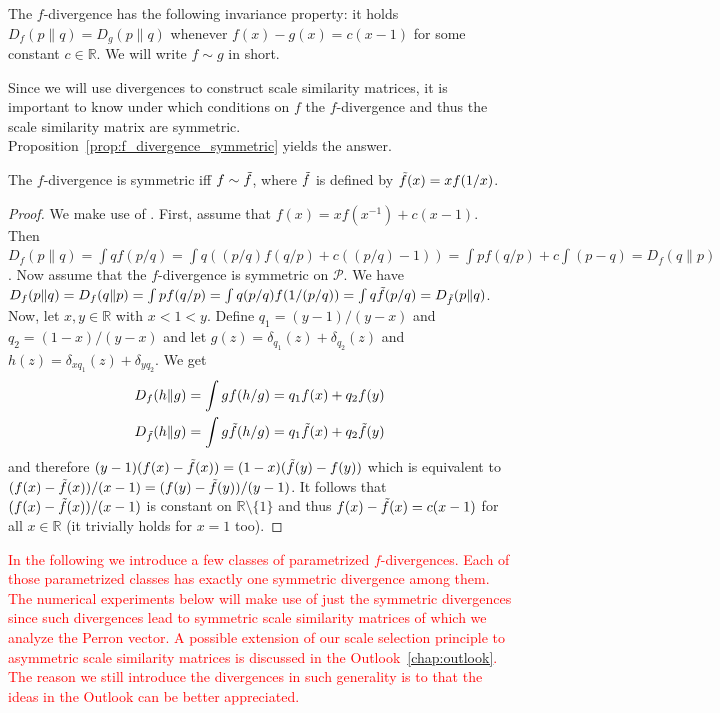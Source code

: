 The $f$-divergence has the following invariance property: it holds $D_f(p\| q)=D_g(p\|q)$ whenever $f(x)-g(x)=c(x-1)$ for some constant $c\in\mathbb{R}$. We will write $f\sim g$ in short.

Since we will use divergences to construct scale similarity matrices, it is important to know under which conditions on $f$ the $f$-divergence and thus the scale similarity matrix are symmetric. Proposition~\ref{prop:f_divergence_symmetric} yields the answer.

\begin{Prop}\label{prop:f_divergence_symmetric}
    The $f$-divergence is symmetric iff $f\sim\Tilde{f}$, where $\Tilde{f}$ is defined by $\Tilde{f}(x)=xf(1/x)$.
\end{Prop}

\begin{proof}
    We make use of \cite[Proposition 7.2]{polyanskiy_information_2025}. First, assume that $f(x)=xf(x^{-1})+c(x-1)$. Then $D_f(p\|q)=\int qf(p/q)=\int q((p/q)f(q/p)+c((p/q)-1))=\int pf(q/p)+c\int(p-q)=D_f(q\|p)$. Now assume that the $f$-divergence is symmetric on $\mathcal{P}$. We have $D_f(p\|q)=D_f(q\|p)=\int pf(q/p)=\int q (p/q)f(1/(p/q))=\int q\Tilde{f}(p/q)=D_{\Tilde{f}}(p\|q)$. Now, let $x,y\in\mathbb{R}$ with $x<1<y$. Define $q_1=(y-1)/(y-x)$ and $q_2=(1-x)/(y-x)$ and let $g(z)=\delta_{q_1}(z)+\delta_{q_2}(z)$ and $h(z)=\delta_{xq_1}(z)+\delta_{yq_2}$. We get
    \begin{align*}
        D_f(h\|g)&=\int gf(h/g)=q_1f(x)+q_2f(y)\\
        D_{\Tilde{f}}(h\|g)&=\int g\Tilde{f}(h/g)=q_1\Tilde{f}(x)+q_2\Tilde{f}(y)
    \end{align*}
    and therefore $(y-1)(f(x)-\Tilde{f}(x))=(1-x)(\Tilde{f}(y)-f(y))$ which is equivalent to $(f(x)-\Tilde{f}(x))/(x-1)=(f(y)-\Tilde{f}(y))/(y-1)$. It follows that $(f(x)-\Tilde{f}(x))/(x-1)$ is constant on $\mathbb{R}\setminus\{1\}$ and thus $f(x)-\Tilde{f}(x)=c(x-1)$ for all $x\in\mathbb{R}$ (it trivially holds for $x=1$ too).
\end{proof}

\textcolor{red}{In the following we introduce a few classes of parametrized $f$-divergences. Each of those parametrized classes has exactly one symmetric divergence among them. The numerical experiments below will make use of just the symmetric divergences since such divergences lead to symmetric scale similarity matrices of which we analyze the Perron vector. A possible extension of our scale selection principle to asymmetric scale similarity matrices is discussed in the Outlook~\ref{chap:outlook}. The reason we still introduce the divergences in such generality is to that the ideas in the Outlook can be better appreciated.}

